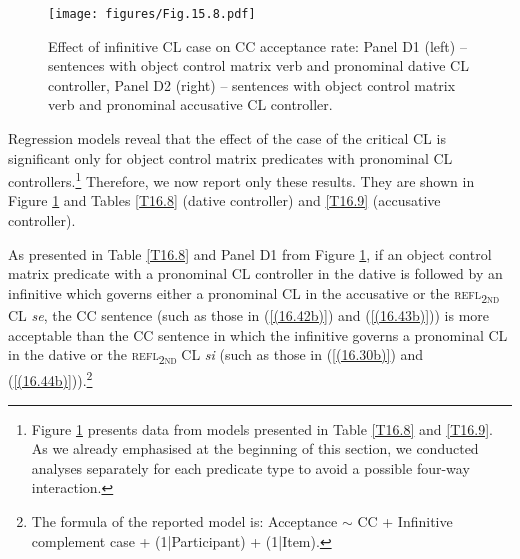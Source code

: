 \begin{figure}
\caption[Effect of infinitive CL case on CC acceptance rate: Panel D1 (left) – sentences with object control matrix verb and pronominal dative CL controller, Panel D2 (right) – sentences with object control matrix verb and pronominal accusative CL controller.]{Effect of infinitive CL case on CC acceptance rate: Panel D1 (left) – sentences with object control matrix verb and pronominal dative CL controller, Panel D2 (right) – sentences with object control matrix verb and pronominal accusative CL controller.}
\label{F16.9}
\texttt{[image: figures/Fig.15.8.pdf]}
\end{figure}

Regression models reveal that the effect of the case of the critical CL is significant only for object control matrix predicates with pronominal CL controllers.\footnote{Figure \ref{F16.9} presents data from models presented in Table \ref{T16.8} and \ref{T16.9}. As we already emphasised at the beginning of this section, we conducted analyses separately for each predicate type to avoid a possible four-way interaction.} Therefore, we now report only these results. They are shown in Figure \ref{F16.9} and Tables \ref{T16.8} (dative controller) and \ref{T16.9} (accusative controller).

As presented in Table \ref{T16.8} and Panel D1 from Figure \ref{F16.9}, if an object control matrix predicate with a pronominal CL controller in the dative is followed by an infinitive which governs either a pronominal CL in the accusative or the \textsc{refl\textsubscript{2nd}} CL \textit{se}, the CC sentence (such as those in (\ref{(16.42b)}) and (\ref{(16.43b)})) is more acceptable than the CC sentence in which the infinitive governs a pronominal CL in the dative or the \textsc{refl\textsubscript{2nd}} CL \textit{si} (such as those in (\ref{(16.30b)}) and (\ref{(16.44b)})).\footnote{The formula of the reported model is: Acceptance $\sim$ CC + Infinitive complement case + (1|Participant) + (1|Item).} 

